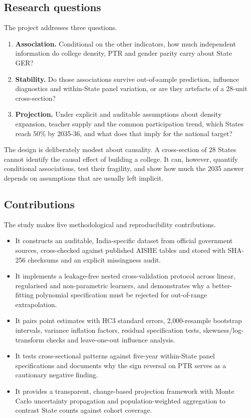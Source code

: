\subsection{Research questions}

The project addresses three questions.

\begin{enumerate}
  \item \textbf{Association.} Conditional on the other indicators, how much independent information do college density, PTR and gender parity carry about State GER?
  \item \textbf{Stability.} Do those associations survive out-of-sample prediction, influence diagnostics and within-State panel variation, or are they artefacts of a 28-unit cross-section?
  \item \textbf{Projection.} Under explicit and auditable assumptions about density expansion, teacher supply and the common participation trend, which States reach 50\% by 2035-36, and what does that imply for the national target?
\end{enumerate}

The design is deliberately modest about causality. A cross-section of 28 States cannot identify the causal effect of building a college. It can, however, quantify conditional associations, test their fragility, and show how much the 2035 answer depends on assumptions that are usually left implicit.

\subsection{Contributions}

The study makes five methodological and reproducibility contributions.

\begin{itemize}
  \item It constructs an auditable, India-specific dataset from official government sources, cross-checked against published AISHE tables and stored with SHA-256 checksums and an explicit missingness audit.
  \item It implements a leakage-free nested cross-validation protocol across linear, regularised and non-parametric learners, and demonstrates why a better-fitting polynomial specification must be rejected for out-of-range extrapolation.
  \item It pairs point estimates with HC3 standard errors, 2,000-resample bootstrap intervals, variance inflation factors, residual specification tests, skewness/log-transform checks and leave-one-out influence analysis.
  \item It tests cross-sectional patterns against five-year within-State panel specifications and documents why the sign reversal on PTR serves as a cautionary negative finding.
  \item It provides a transparent, change-based projection framework with Monte Carlo uncertainty propagation and population-weighted aggregation to contrast State counts against cohort coverage.
\end{itemize}

